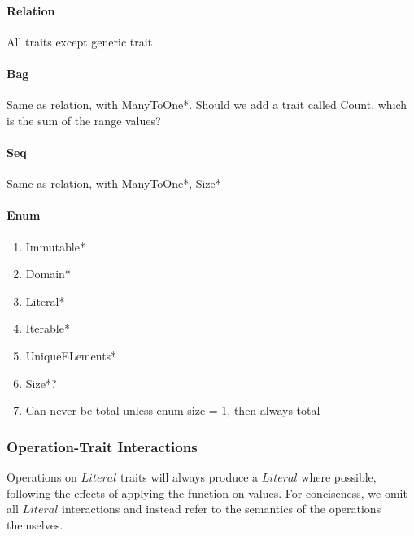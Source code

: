 \documentclass{article}
\begin{document}
\paragraph{Relation} All traits except generic trait

\paragraph{Bag} Same as relation, with ManyToOne*. Should we add a trait called Count, which is the sum of the range values?

\paragraph{Seq} Same as relation, with ManyToOne*, Size*

\paragraph{Enum}
\begin{enumerate}
  \item Immutable*
  \item Domain*
  \item Literal*
  \item Iterable*
  \item UniqueELements*
  \item Size*?
  \item Can never be total unless enum size = 1, then always total
\end{enumerate}

\subsubsection{Operation-Trait Interactions}
Operations on $Literal$ traits will always produce a $Literal$ where possible, following the effects of applying the function on values. For conciseness, we omit all $Literal$ interactions and instead refer to the semantics of the operations themselves. %
\end{document}
